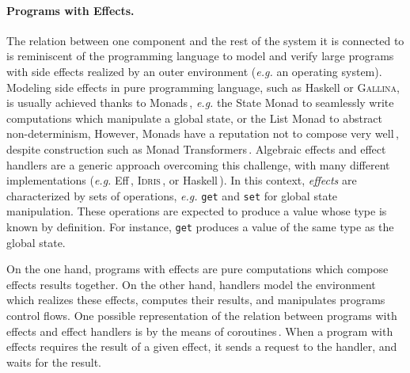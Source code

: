 \paragraph{Programs with Effects.}
%
The relation between one component and the rest of the system it is connected to
is reminiscent of the programming language to model and verify large programs
with side effects realized by an outer environment (\emph{e.g.} an operating
system). 
%
Modeling side effects in pure programming language, such as Haskell or {\scshape
  Gallina}, is usually achieved thanks to
Monads\,\cite{wadler1990comprehending,jones2005io}, \emph{e.g.} the State Monad  to seamlessly write computations which manipulate a global state, or the List
Monad to abstract non-determinism,
%
However, Monads have a reputation not to compose very
well\,\cite{hyland2006combining}, despite construction such as Monad
Transformers\,\cite{liang1995mtl}.
%
Algebraic effects and effect handlers are a generic approach overcoming this
challenge, with many different implementations (\emph{e.g.}
Eff\,\cite{bauer2015effects}, {\scshape Idris}\,\cite{brady2013idris}, or
Haskell\,\cite{kiselyov2013extensible}).
%
In this context, \emph{effects} are characterized by sets of operations,
\emph{e.g.} \texttt{get} and \texttt{set} for global state manipulation.
%
These operations are expected to produce a value whose type is known by
definition.
%
For instance, \texttt{get} produces a value of the same type as the global
state.

On the one hand, programs with effects are pure computations which compose
effects results together.
%
On the other hand, handlers model the environment which realizes these effects,
computes their results, and manipulates programs control flows.
%
One possible representation of the relation between programs with effects and
effect handlers is by the means of coroutines\,\cite{kiselyov2013extensible}.
%
When a program with effects requires the result of a given effect, it sends a
request to the handler, and waits for the result.

